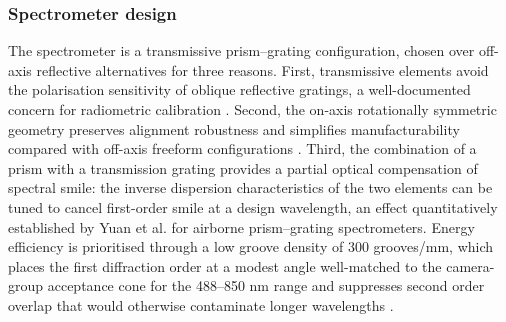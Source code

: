 \documentclass{iac}
\begin{document}
\subsubsection{Spectrometer design}
The spectrometer is a transmissive prism–grating configuration, chosen over off-axis reflective alternatives for three reasons. First, transmissive elements avoid the polarisation sensitivity of oblique reflective gratings, a well-documented concern for radiometric calibration \cite{zhang2023prismgrating}. Second, the on-axis rotationally symmetric geometry preserves alignment robustness and simplifies manufacturability compared with off-axis freeform configurations \cite{xue2021underwater}. Third, the combination of a prism with a transmission grating provides a partial optical compensation of spectral smile: the inverse dispersion characteristics of the two elements can be tuned to cancel first-order smile at a design wavelength, an effect quantitatively established by Yuan et al. \cite{yuan2019airborne} for airborne prism–grating spectrometers. Energy efficiency is prioritised through a low groove density of 300 grooves/mm, which places the first diffraction order at a modest angle well-matched to the camera-group acceptance cone for the 488–850 nm range and suppresses second order overlap that would otherwise contaminate longer wavelengths \cite{yuan2019airborne}.
\end{document}
